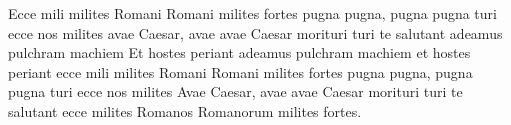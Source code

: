 
\beginverse*
Ecce mili milites Romani
Romani milites fortes
pugna pugna, pugna pugna turi
ecce nos milites 
avae Caesar, avae avae Caesar
morituri turi te salutant
adeamus pulchram machiem
\endverse
\beginverse*
Et hostes periant
adeamus pulchram machiem
et hostes periant
ecce mili milites Romani
Romani milites fortes
pugna pugna, pugna pugna turi
ecce nos milites
\endverse
\beginverse*
Avae Caesar, avae avae Caesar
morituri turi te salutant
ecce milites Romanos
Romanorum milites fortes.
\endverse
\endsong